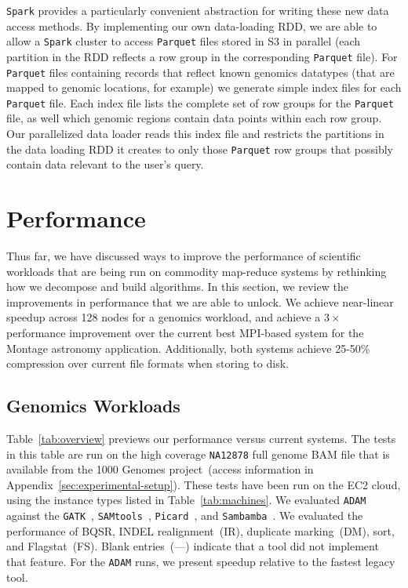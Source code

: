 \documentclass{sig-alternate}
\begin{document}
\texttt{Spark} provides a particularly convenient abstraction for writing these new data access methods.  By
implementing our own data-loading RDD, we are able to allow a \texttt{Spark} cluster to access \texttt{Parquet} files
stored in S3 in parallel (each partition in the RDD reflects a row group in the corresponding \texttt{Parquet} file).
For \texttt{Parquet} files containing records that reflect known genomics datatypes (that are mapped to genomic
locations, for example) we generate simple index files for each \texttt{Parquet} file.  Each index file lists the
complete set of row groups for the \texttt{Parquet} file, as well which genomic regions contain data points within
each row group.  Our parallelized data loader reads this index file and restricts the partitions in the data
loading RDD it creates to only those \texttt{Parquet} row groups that possibly contain data relevant to the
user's query.

\section{Performance}
\label{sec:performance}

Thus far, we have discussed ways to improve the performance of scientific workloads that are
being run on commodity map-reduce systems by rethinking how we decompose and build algorithms.
In this section, we review the improvements in performance that we are able to unlock. We achieve
near-linear speedup across 128 nodes for a genomics workload, and achieve a $3\times$ performance
improvement over the current best MPI-based system for the Montage astronomy application.
Additionally, both systems achieve 25-50\% compression over current file formats when storing to disk.

\subsection{Genomics Workloads}
\label{sec:genomics-performance}

Table~\ref{tab:overview} previews our performance versus current systems. The tests in this table are run on the
high coverage \texttt{NA12878} full genome BAM file that is available from the 1000 \linebreak Genomes
project~(access information in Appendix~\ref{sec:experimental-setup}). These tests have been run on the EC2 cloud,
using the instance types listed in
Table~\ref{tab:machines}. We evaluated \texttt{ADAM} against the \texttt{GATK}~\cite{depristo11},
\texttt{SAMtools}~\cite{li11}, \texttt{Picard}~\cite{picard}, and \texttt{Sambamba}~\cite{tarasov15}. We evaluated
the performance of BQSR, INDEL realignment~(IR), duplicate marking~(DM), sort, and Flagstat~(FS). Blank
entries~(---) indicate that a tool did not implement that feature. For the \texttt{ADAM} runs, we present
speedup relative to the fastest legacy tool.
\end{document}
